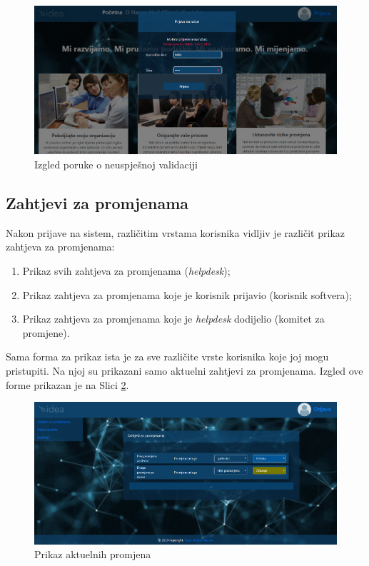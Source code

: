 \documentclass[12pt,a4paper]{article}
\begin{document}
\begin{figure}[H]
\center
\includegraphics[scale=0.35]{../res/UI/loginFailed.PNG}
\caption{Izgled poruke o neuspješnoj validaciji}
\label{s6}
\end{figure}

\newpage

\subsection{Zahtjevi za promjenama}

Nakon prijave na sistem, različitim vrstama korisnika vidljiv je različit prikaz zahtjeva za promjenama:

\begin{enumerate}
\item Prikaz svih zahtjeva za promjenama (\textit{helpdesk});
\item Prikaz zahtjeva za promjenama koje je korisnik prijavio (korisnik softvera);
\item Prikaz zahtjeva za promjenama koje je \textit{helpdesk} dodijelio (komitet za promjene).
\end{enumerate}

Sama forma za prikaz ista je za sve različite vrste korisnika koje joj mogu pristupiti. Na njoj su prikazani samo aktuelni zahtjevi za promjenama. Izgled ove forme prikazan je na Slici \ref{s7}.

\begin{figure}[H]
\center
\includegraphics[scale=0.35]{../res/UI/changeActual.PNG}
\caption{Prikaz aktuelnih promjena}
\label{s7}
\end{figure}
\end{document}
